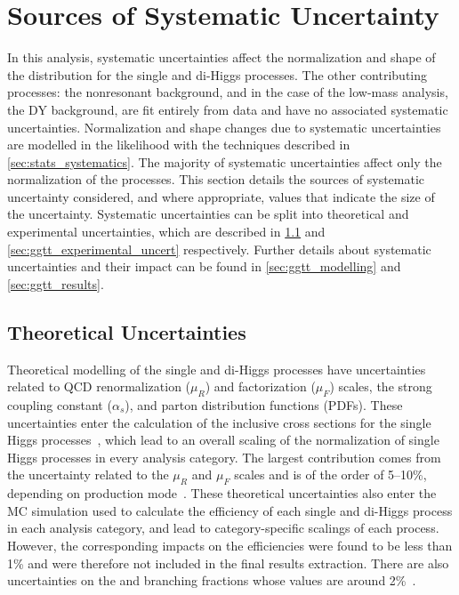 \section{Sources of Systematic Uncertainty}\label{sec:ggtt_systematics}
In this analysis, systematic uncertainties affect the normalization and shape of the \mgg distribution for the single and di-Higgs processes. The other contributing processes: the nonresonant background, and in the case of the low-mass \XYggHtt analysis, the DY background, are fit entirely from data and have no associated systematic uncertainties. Normalization and shape changes due to systematic uncertainties are modelled in the likelihood with the techniques described in \cref{sec:stats_systematics}. The majority of systematic uncertainties affect only the normalization of the processes. This section details the sources of systematic uncertainty considered, and where appropriate, values that indicate the size of the uncertainty. Systematic uncertainties can be split into theoretical and experimental uncertainties, which are described in \cref{sec:ggtt_theoretical_uncert} and \cref{sec:ggtt_experimental_uncert} respectively. Further details about systematic uncertainties and their impact can be found in \cref{sec:ggtt_modelling} and \cref{sec:ggtt_results}.

\subsection{Theoretical Uncertainties}\label{sec:ggtt_theoretical_uncert}
Theoretical modelling of the single and di-Higgs processes have uncertainties related to QCD renormalization ($\mu_R$) and factorization ($\mu_F$) scales, the strong coupling constant ($\alpha_s$), and parton distribution functions (PDFs). These uncertainties enter the calculation of the inclusive cross sections for the single Higgs processes~\cite{LHCHiggsCrossSectionWorkingGroup:2016ypw}, which lead to an overall scaling of the normalization of single Higgs processes in every analysis category. The largest contribution comes from the uncertainty related to the $\mu_R$ and $\mu_F$ scales and is of the order of 5--10\%, depending on \PH production mode~\cite{LHCHiggsCrossSectionWorkingGroup:2016ypw}. These theoretical uncertainties also enter the MC simulation used to calculate the efficiency of each single and di-Higgs process in each analysis category, and lead to category-specific scalings of each process. However, the corresponding impacts on the efficiencies were found to be less than 1\% and were therefore not included in the final results extraction. There are also uncertainties on the \Hgg and \Htautau branching fractions whose values are around 2\%~\cite{LHCHiggsCrossSectionWorkingGroup:2016ypw}.

